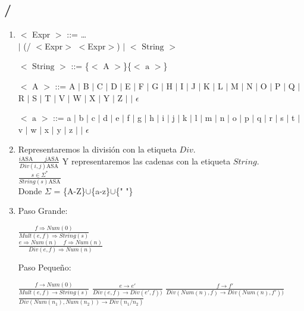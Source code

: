\documentclass{article}
\begin{document}
\subsection*{/}
\begin{enumerate}[label = (\alph*)]
    \item $<$ Expr $>$ ::= \ldots \\
          $|$ (/ $<$Expr$>$ $<$Expr$>$)
          $|$ $<\text{ String }>$

          $<\text{ String }>$ ::= \{$<\text{ A }>$\}\{$<\text{ a }>$\}

          $<\text{ A }>$ ::= A $|$ B $|$ C $|$ D $|$ E $|$ F $|$ G $|$ H $|$ I $|$ J $|$ K $|$ L $|$ M $|$ N $|$ O $|$ P $|$ Q $|$ R $|$ S $|$ T $|$ V $|$ W $|$ X $|$ Y $|$ Z $|$   $|$ $\epsilon$

          $<\text{ a }>$ ::= a $|$ b $|$ c $|$ d $|$ e $|$ f $|$ g $|$ h $|$ i $|$ j $|$ k $|$ l $|$ m $|$ n $|$ o $|$ p $|$ q $|$ r $|$ s $|$ t $|$ v $|$ w $|$ x $|$ y $|$ z $|$   $|$ $\epsilon$


    \item Representaremos la división con la etiqueta $Div$.\\
    $\frac{i\text{ASA}\qquad j\text{ASA}}{Div(i,j)\text{ASA}}$
    Y representaremos las cadenas con la etiqueta $String$.\\
    $\frac{s \in \Sigma^*}{String(s)\text{ASA}}$\\
    Donde $\Sigma$ = \{A-Z\}$\cup$\{a-z\}$\cup$\{" "\}
    
    \item Paso Grande: \begin{center}
        $\frac{f\Rightarrow Num(0)}{Mult(e,f)\Rightarrow String(s)}$\\
        $\frac{e\Rightarrow Num(n)\quad f\Rightarrow Num(n)}{Div(e,f)\Rightarrow Num(n)}$
    \end{center}
    
    Paso Pequeño: \begin{center}
        $\frac{f\rightarrow Num(0)}{Mult(e,f)\rightarrow String(s)}$
        $\frac{e\rightarrow e'}{Div(e,f)\rightarrow Div(e',f))}$
        $\frac{f\rightarrow f'}{Div(Num(n),f)\rightarrow Div(Num(n),f'))}$
        $\frac{}{Div(Num(n_1),Num(n_2))\rightarrow Div(n_1/n_2)}$
    \end{center}
\end{enumerate}
\end{document}
